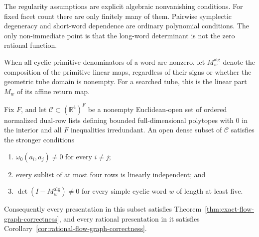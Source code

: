 The regularity assumptions are explicit algebraic nonvanishing conditions.
For fixed facet count there are only finitely many of them.  Pairwise
symplectic degeneracy and short-word dependence are ordinary polynomial
conditions.  The only non-immediate point is that the long-word determinant is
not the zero rational function.

When all cyclic primitive denominators of a word are nonzero, let
\(M_w^{\mathrm{alg}}\) denote the composition of the primitive linear maps,
regardless of their signs or whether the geometric tube domain is nonempty.
For a searched tube, this is the linear part \(M_w\) of its affine return map.

\begin{proposition}
\label{prop:flow-graph-presentation-chamber-genericity}
Fix \(F\), and let \(\mathcal C\subset(\mathbb R^4)^F\) be a nonempty
Euclidean-open set of ordered normalized dual-row lists defining bounded
full-dimensional polytopes with \(0\) in the interior and all \(F\)
inequalities irredundant.  An open dense subset of \(\mathcal C\) satisfies
the stronger conditions
\begin{enumerate}
  \item \(\omega_0(a_i,a_j)\ne0\) for every \(i\ne j\);
  \item every sublist of at most four rows is linearly independent; and
  \item \(\det(I-M_w^{\mathrm{alg}})\ne0\) for every simple cyclic word \(w\)
    of length at least five.
\end{enumerate}
Consequently every presentation in this subset satisfies
Theorem~\ref{thm:exact-flow-graph-correctness}, and every rational presentation
in it satisfies Corollary~\ref{cor:rational-flow-graph-correctness}.
\end{proposition}

